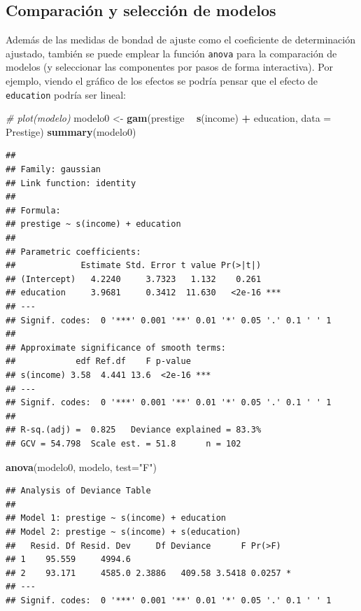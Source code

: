 \documentclass[
  spanish,
]{book}
\newenvironment{Shaded}{\begin{snugshade}}{\end{snugshade}}
\newcommand{\CommentTok}[1]{\textcolor[rgb]{0.56,0.35,0.01}{\textit{#1}}}
\newcommand{\DataTypeTok}[1]{\textcolor[rgb]{0.13,0.29,0.53}{#1}}
\newcommand{\KeywordTok}[1]{\textcolor[rgb]{0.13,0.29,0.53}{\textbf{#1}}}
\newcommand{\NormalTok}[1]{#1}
\newcommand{\OperatorTok}[1]{\textcolor[rgb]{0.81,0.36,0.00}{\textbf{#1}}}
\newcommand{\StringTok}[1]{\textcolor[rgb]{0.31,0.60,0.02}{#1}}
\theoremstyle{break}
\theoremstyle{definition}
\theoremstyle{definition}
\theoremstyle{definition}
\theoremstyle{remark}
\begin{document}
\hypertarget{comparaciuxf3n-y-selecciuxf3n-de-modelos}{%
\subsection{Comparación y selección de modelos}\label{comparaciuxf3n-y-selecciuxf3n-de-modelos}}

Además de las medidas de bondad de ajuste como el coeficiente de determinación ajustado, también se puede emplear la función \texttt{anova} para la comparación de modelos (y seleccionar las componentes por pasos de forma interactiva).
Por ejemplo, viendo el gráfico de los efectos se podría pensar que el efecto de \texttt{education} podría ser lineal:

\begin{Shaded}
\begin{Highlighting}[]
\CommentTok{# plot(modelo)}
\NormalTok{modelo0 <-}\StringTok{ }\KeywordTok{gam}\NormalTok{(prestige }\OperatorTok{~}\StringTok{ }\KeywordTok{s}\NormalTok{(income) }\OperatorTok{+}\StringTok{ }\NormalTok{education, }\DataTypeTok{data =}\NormalTok{ Prestige)}
\KeywordTok{summary}\NormalTok{(modelo0)}
\end{Highlighting}
\end{Shaded}

\begin{verbatim}
## 
## Family: gaussian 
## Link function: identity 
## 
## Formula:
## prestige ~ s(income) + education
## 
## Parametric coefficients:
##             Estimate Std. Error t value Pr(>|t|)    
## (Intercept)   4.2240     3.7323   1.132    0.261    
## education     3.9681     0.3412  11.630   <2e-16 ***
## ---
## Signif. codes:  0 '***' 0.001 '**' 0.01 '*' 0.05 '.' 0.1 ' ' 1
## 
## Approximate significance of smooth terms:
##            edf Ref.df    F p-value    
## s(income) 3.58  4.441 13.6  <2e-16 ***
## ---
## Signif. codes:  0 '***' 0.001 '**' 0.01 '*' 0.05 '.' 0.1 ' ' 1
## 
## R-sq.(adj) =  0.825   Deviance explained = 83.3%
## GCV = 54.798  Scale est. = 51.8      n = 102
\end{verbatim}

\begin{Shaded}
\begin{Highlighting}[]
\KeywordTok{anova}\NormalTok{(modelo0, modelo, }\DataTypeTok{test=}\StringTok{"F"}\NormalTok{)}
\end{Highlighting}
\end{Shaded}

\begin{verbatim}
## Analysis of Deviance Table
## 
## Model 1: prestige ~ s(income) + education
## Model 2: prestige ~ s(income) + s(education)
##   Resid. Df Resid. Dev     Df Deviance      F Pr(>F)  
## 1    95.559     4994.6                                
## 2    93.171     4585.0 2.3886   409.58 3.5418 0.0257 *
## ---
## Signif. codes:  0 '***' 0.001 '**' 0.01 '*' 0.05 '.' 0.1 ' ' 1
\end{verbatim}
\end{document}
